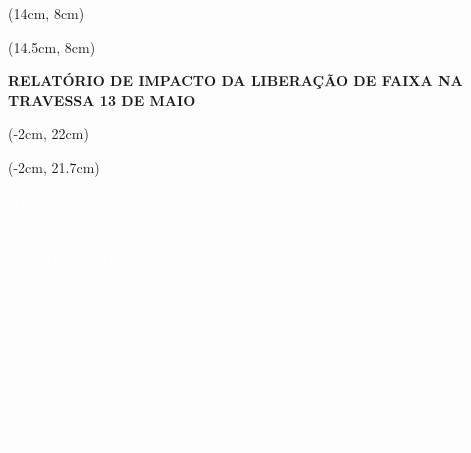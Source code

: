 \begin{textblock*}{7cm}(14cm, 8cm)
\end{textblock*}

\begin{textblock*}{7cm}(14.5cm, 8cm)
\begin{center}
{\fontsize{15pt}{18pt}\selectfont\sffamily\bfseries\color{white} \textbf{RELATÓRIO DE IMPACTO DA LIBERAÇÃO DE FAIXA NA TRAVESSA 13 DE MAIO} \par}
\end{center}
\end{textblock*}


    
        
\begin{textblock*}{10.5cm}(-2cm, 22cm)
\end{textblock*}

\begin{textblock*}{10.5cm}(-2cm, 21.7cm)

\begin{center}

    
   \textcolor{white}{\textbf{Antonio Marcos De Lima}$^1$  \\
    \textbf{Ronaldo Carlos da Silva}$^2$  \\ 
    \textbf{Winicius A. S. Silva}$^3$ \\
     \textbf{Jean Gomes Turet}$^4$ \\  
    \textbf{Thyago C. C. Nepomuceno}$^5$ \\  
}
   \vspace{0.1cm}
    \textcolor{white}{$^1$ Email: antonio.marcoslima@ufpe.br \\
     $^2$ Email: ronaldo.carlos@ufpe.br \\
    $^3$ Email: winicius.silva@ufpe.br \\
    $^4$  Email: jean.turet@ufpe.br\\
    $^5$  Email: thyago.nepomuceno@ufpe.br \\
    $^*$autores correspondentes}\\
    \vspace{0.1cm}
    \textcolor{white}{Universidade Federal de Pernambuco}\\
    \vspace{0.2cm}
    \textcolor{white}{\textbf{Caruaru, 2025}}
    

\end{center}

\end{textblock*}